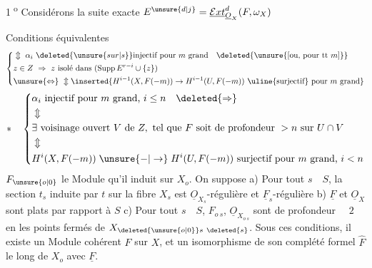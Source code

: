 \textcircled{\scriptsize 1\textsuperscript{o}} Considérons la suite exacte  $E^{\unsure{d|j}}=\underline{\mathcal{E}xt}^{d}_{\underline O_X}(F,\omega_X)$


Conditions équivalentes
\[
\left\{\begin{aligned}
&\Updownarrow\ \alpha_i\ \deleted{\unsure{sur|s}}\text{injectif pour }m\text{ grand}\quad\deleted{\unsure{[\text{ou, pour tt }m]}}\\
&z\in Z\ \Rightarrow\ z\text{ isolé dans }(\operatorname{Supp} E^{r-i}\cup\{z\})\\
&\unsure{\Leftrightarrow}\ \Updownarrow
\inserted{H^{i-1}(X,F(-m))\to H^{i-1}(U,F(-m))\ \text{\uline{surjectif} pour }m\text{ grand}}
\end{aligned}\right.
\]
\[
*\quad\left\{\begin{aligned}
&\alpha_i\text{ injectif pour }m\text{ grand, }i\leq n\quad\deleted{\Rightarrow}\\
&\Updownarrow\\
&\exists\ \text{voisinage ouvert }V\text{ de }Z,\text{ tel que }F\text{ soit de profondeur }>n\text{ sur }U\cap V\\
&\Updownarrow\\
&H^i(X,F(-m))\mathrel{\unsure{-|\to}}H^i(U,F(-m))\ \text{surjectif pour }m\text{ grand, }i<n
\end{aligned}\right.
\]
$F_{\unsure{o|0}}$ le Module qu'il induit sur $X_o$. On suppose \quad a) Pour tout $s\quad S$, la section $t_s$ induite par $t$ sur la fibre $X_s$ est $\underline{O}_{X_s}$-régulière et $\underline{F}_s$-régulière \quad b) $\underline{F}$ et $\underline{O}_X$ sont plats par rapport à $S$ \quad c) Pour tout $s\quad S$, $F_{o\ s}$,  $\underline{O}_{X_{o\ s}}$  sont de profondeur $\quad 2$ en les points fermés de $X_{\deleted{\unsure{o|0}}s\ \deleted{s}}$. Sous ces conditions, il existe un Module cohérent $F$ sur $X$, et un isomorphisme de son complété formel $\widehat{F}$ le long de $X_o$ avec $\underline F$.


